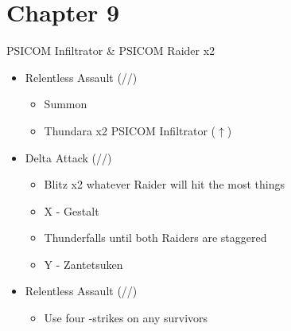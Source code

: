 \chapter{Chapter 9}

\renewcommand{\first}{[1] Relentless Assault (\rav/\rav/\com)}
\renewcommand{\second}{[2] Delta Attack (\com/\rav/\sen)}
\begin{battle}[0:18]{PSICOM Infiltrator \& PSICOM Raider x2}
	\begin{itemize}
		\item \first
		      \begin{itemize}
			      \item Summon
			      \item Thundara x2 PSICOM Infiltrator ($\uparrow$)
		      \end{itemize}
		\item \second
		      \begin{itemize}
			      \item Blitz x2 whatever Raider will hit the most things
			      \item X - Gestalt
			      \item Thunderfalls until both Raiders are staggered
			      \item Y - Zantetsuken
		      \end{itemize}
		\item \first
		      \begin{itemize}
			      \item Use four -strikes on any survivors
		      \end{itemize}
	\end{itemize}
	  
\end{battle}
\vfill
\ 
